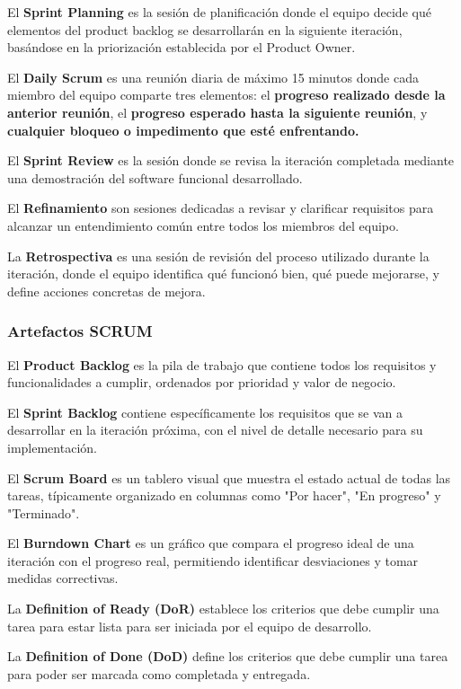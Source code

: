 \documentclass[a4paper,11pt]{report}
\begin{document}
El \textbf{Sprint Planning} es la sesión de planificación donde el equipo decide qué elementos del product backlog se desarrollarán en la siguiente iteración, basándose en la priorización establecida por el Product Owner.

El \textbf{Daily Scrum} es una reunión diaria de máximo 15 minutos donde cada miembro del equipo comparte tres elementos: el \textbf{progreso realizado desde la anterior reunión}, el \textbf{progreso esperado hasta la siguiente reunión}, y \textbf{cualquier bloqueo o impedimento que esté enfrentando.}

El \textbf{Sprint Review} es la sesión donde se revisa la iteración completada mediante una demostración del software funcional desarrollado.

El \textbf{Refinamiento} son sesiones dedicadas a revisar y clarificar requisitos para alcanzar un entendimiento común entre todos los miembros del equipo.

La \textbf{Retrospectiva} es una sesión de revisión del proceso utilizado durante la iteración, donde el equipo identifica qué funcionó bien, qué puede mejorarse, y define acciones concretas de mejora.



\subsubsection{Artefactos SCRUM}

El \textbf{Product Backlog} es la pila de trabajo que contiene todos los requisitos y funcionalidades a cumplir, ordenados por prioridad y valor de negocio.

El \textbf{Sprint Backlog} contiene específicamente los requisitos que se van a desarrollar en la iteración próxima, con el nivel de detalle necesario para su implementación.

El \textbf{Scrum Board} es un tablero visual que muestra el estado actual de todas las tareas, típicamente organizado en columnas como "Por hacer", "En progreso" y "Terminado".

El \textbf{Burndown Chart} es un gráfico que compara el progreso ideal de una iteración con el progreso real, permitiendo identificar desviaciones y tomar medidas correctivas.

La \textbf{Definition of Ready (DoR)} establece los criterios que debe cumplir una tarea para estar lista para ser iniciada por el equipo de desarrollo.

La \textbf{Definition of Done (DoD)} define los criterios que debe cumplir una tarea para poder ser marcada como completada y entregada.
\end{document}
